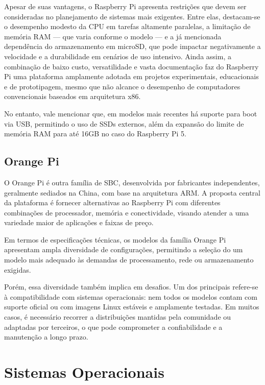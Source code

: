 Apesar de suas vantagens, o Raspberry Pi apresenta restrições que devem ser consideradas no planejamento de sistemas mais exigentes. Entre elas, destacam-se o desempenho modesto da CPU em tarefas altamente paralelas, a limitação de memória RAM --- que varia conforme o modelo --- e a já mencionada dependência do armazenamento em microSD, que pode impactar negativamente a velocidade e a durabilidade em cenários de uso intensivo. Ainda assim, a combinação de baixo custo, versatilidade e vasta documentação faz do Raspberry Pi uma plataforma amplamente adotada em projetos experimentais, educacionais e de prototipagem, mesmo que não alcance o desempenho de computadores convencionais baseados em arquitetura x86.

No entanto, vale mencionar que, em modelos mais recentes há suporte para boot via USB, permitindo o uso de SSDs externos, além da expansão do limite de memória RAM para até 16GB no caso do Raspberry Pi 5. 

\subsection{Orange Pi}
\label{subsection:OrangePi}

O Orange Pi \citep{orangepihw2025} é outra família de SBC, desenvolvida por fabricantes independentes, geralmente sediados na China, com base na arquitetura ARM. A proposta central da plataforma é fornecer alternativas ao Raspberry Pi com diferentes combinações de processador, memória e conectividade, visando atender a uma variedade maior de aplicações e faixas de preço.

Em termos de especificações técnicas, os modelos da família Orange Pi apresentam ampla diversidade de configurações, permitindo a seleção do um modelo mais adequado às demandas de processamento, rede ou armazenamento exigidas.

Porém, essa diversidade também implica em desafios. Um dos principais refere-se à compatibilidade com sistemas operacionais: nem todos os modelos contam com suporte oficial ou com imagens Linux estáveis e amplamente testadas. Em muitos casos, é necessário recorrer a distribuições mantidas pela comunidade ou adaptadas por terceiros, o que pode comprometer a confiabilidade e a manutenção a longo prazo.


\section{Sistemas Operacionais}
\label{section:SistemasOperacionais}

